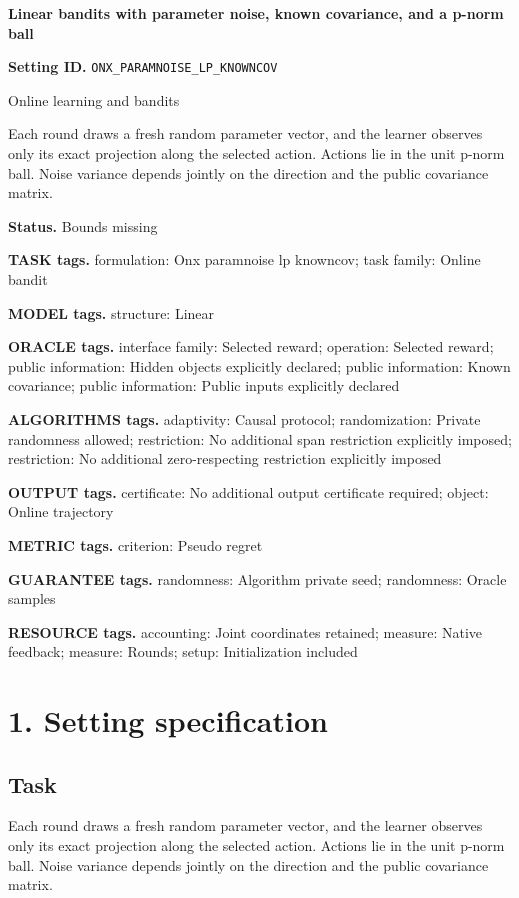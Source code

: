 \documentclass[10pt,a4paper]{article}
\begin{document}
\raggedright

{\LARGE\bfseries\sffamily\color{AtlasNavy} Linear bandits with parameter noise, known covariance, and a p-norm ball\par}\vspace{5pt}
\textbf{Setting ID.} \texttt{ONX\_\allowbreak{}PARAMNOISE\_\allowbreak{}LP\_\allowbreak{}KNOWNCOV}

Online learning and bandits

Each round draws a fresh random parameter vector, and the learner observes only its exact projection along the selected action. Actions lie in the unit p-norm ball. Noise variance depends jointly on the direction and the public covariance matrix.

\textbf{Status.} Bounds missing

\textbf{TASK tags.} formulation: Onx paramnoise lp knowncov; task family: Online bandit

\textbf{MODEL tags.} structure: Linear

\textbf{ORACLE tags.} interface family: Selected reward; operation: Selected reward; public information: Hidden objects explicitly declared; public information: Known covariance; public information: Public inputs explicitly declared

\textbf{ALGORITHMS tags.} adaptivity: Causal protocol; randomization: Private randomness allowed; restriction: No additional span restriction explicitly imposed; restriction: No additional zero-respecting restriction explicitly imposed

\textbf{OUTPUT tags.} certificate: No additional output certificate required; object: Online trajectory

\textbf{METRIC tags.} criterion: Pseudo regret

\textbf{GUARANTEE tags.} randomness: Algorithm private seed; randomness: Oracle samples

\textbf{RESOURCE tags.} accounting: Joint coordinates retained; measure: Native feedback; measure: Rounds; setup: Initialization included

\section{1. Setting specification}
\subsection{Task}
Each round draws a fresh random parameter vector, and the learner observes only its exact projection along the selected action. Actions lie in the unit p-norm ball. Noise variance depends jointly on the direction and the public covariance matrix.
\end{document}
